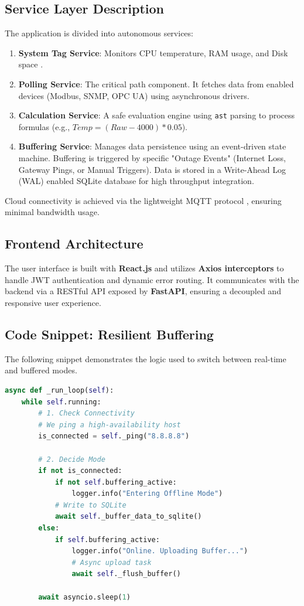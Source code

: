 \documentclass[journal]{IEEEtran}
\begin{document}
\subsection{Service Layer Description}
The application is divided into autonomous services:
\begin{enumerate}
    \item \textbf{System Tag Service}: Monitors CPU temperature, RAM usage, and Disk space \cite{linux_performance_monitoring}.
    \item \textbf{Polling Service}: The critical path component. It fetches data from enabled devices (Modbus, SNMP, OPC UA) using asynchronous drivers.
    \item \textbf{Calculation Service}: A safe evaluation engine using \texttt{ast} parsing to process formulas (e.g., $Temp = (Raw - 4000) * 0.05$).
    \item \textbf{Buffering Service}: Manages data persistence using an event-driven state machine. Buffering is triggered by specific "Outage Events" (Internet Loss, Gateway Pings, or Manual Triggers). Data is stored in a Write-Ahead Log (WAL) enabled SQLite database \cite{sqlite_performance} for high throughput integration.
\end{enumerate}
Cloud connectivity is achieved via the lightweight MQTT protocol \cite{mqtt_iiot}, ensuring minimal bandwidth usage.

\subsection{Frontend Architecture}
The user interface is built with \textbf{React.js} and utilizes \textbf{Axios interceptors} to handle JWT authentication and dynamic error routing. It communicates with the backend via a RESTful API exposed by \textbf{FastAPI}, ensuring a decoupled and responsive user experience.

\subsection{Code Snippet: Resilient Buffering}
The following snippet demonstrates the logic used to switch between real-time and buffered modes.

\begin{footnotesize}
\begin{lstlisting}[language=Python, caption=Store-and-Forward Implementation]
async def _run_loop(self):
    while self.running:
        # 1. Check Connectivity
        # We ping a high-availability host
        is_connected = self._ping("8.8.8.8")
        
        # 2. Decide Mode
        if not is_connected:
            if not self.buffering_active:
                logger.info("Entering Offline Mode")
            # Write to SQLite
            await self._buffer_data_to_sqlite()
        else:
            if self.buffering_active:
                logger.info("Online. Uploading Buffer...")
                # Async upload task
                await self._flush_buffer()
        
        await asyncio.sleep(1)
\end{lstlisting}
\end{footnotesize}
\end{document}
